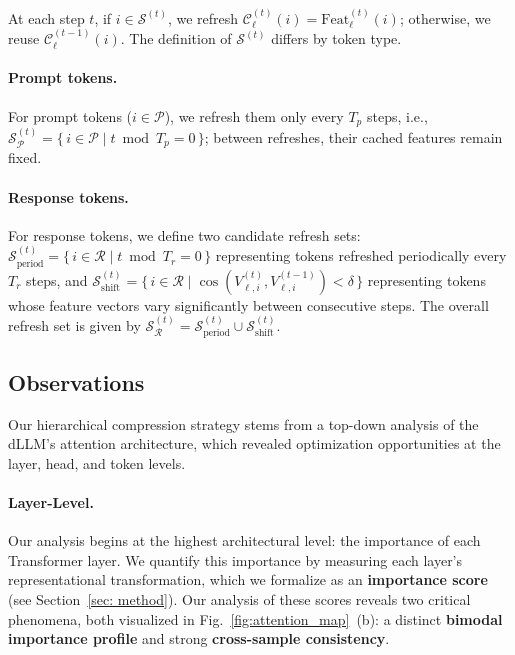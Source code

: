 At each step $t$, if $i \in \mathcal{S}^{(t)}$, we refresh 
$\mathcal{C}_{\ell}^{(t)}(i)=\mathrm{Feat}_{\ell}^{(t)}(i)$;  
otherwise, we reuse $\mathcal{C}_{\ell}^{(t-1)}(i)$. The definition of $\mathcal{S}^{(t)}$ differs by token type.  

\paragraph{Prompt tokens.}
For prompt tokens ($i\in\mathcal{P}$), we refresh them only every $T_{p}$ steps, 
i.e., $\mathcal{S}_{\mathcal{P}}^{(t)}=\{\,i\in\mathcal{P}\mid t\bmod T_{p}=0\,\}$; 
between refreshes, their cached features remain fixed.

\paragraph{Response tokens.}
For response tokens, we define two candidate refresh sets: 
$\mathcal{S}_{\mathrm{period}}^{(t)}=\{\,i\in\mathcal{R}\mid t\bmod T_r=0\,\}$ 
representing tokens refreshed periodically every $T_r$ steps, and 
$\mathcal{S}_{\mathrm{shift}}^{(t)}=\{\,i\in\mathcal{R}\mid 
\cos(V_{\ell,i}^{(t)},V_{\ell,i}^{(t-1)})<\delta\,\}$ 
representing tokens whose feature vectors vary significantly between consecutive steps.
The overall refresh set is given by 
$\mathcal{S}_{\mathcal{R}}^{(t)}=
\mathcal{S}_{\mathrm{period}}^{(t)}\cup
\mathcal{S}_{\mathrm{shift}}^{(t)}$.

\subsection{Observations}
Our hierarchical compression strategy stems from a top-down analysis of the dLLM's attention architecture, which revealed optimization opportunities at the layer, head, and token levels.

\paragraph{Layer-Level.}
Our analysis begins at the highest architectural level: the importance of each Transformer layer. We quantify this importance by measuring each layer's representational transformation, which we formalize as an \textbf{importance score} (see Section~\ref{sec: method}). Our analysis of these scores reveals two critical phenomena, both visualized in Fig.~\ref{fig:attention_map}~(b): a distinct \textbf{bimodal importance profile} and strong \textbf{cross-sample consistency}.

